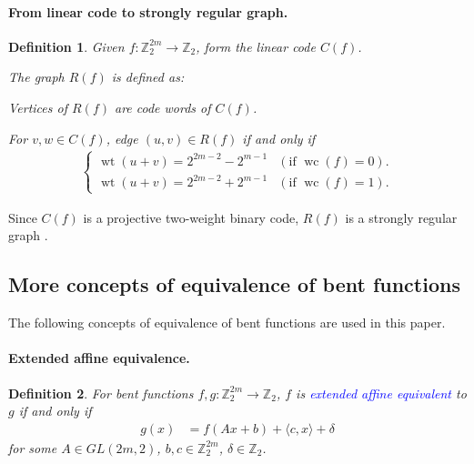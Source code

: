 \documentclass[12pt,a4paper]{article}
\newcommand{\mb}[1]{\mathbb{#1}}
\newcommand{\Z}{\mb{Z}}
\newcommand{\To}{\rightarrow}
\newcommand{\Emph}[1]{\emph{\textcolor{blue}{#1}}}
\newcommand{\weight}[1]{\operatorname{wt}\left(#1\right)}
\newcommand{\weightclass}[1]{\operatorname{wc}\left(#1\right)}
\newtheorem{Definition}{Definition}
\begin{document}
\paragraph*{From linear code to strongly regular graph.}
\begin{Definition}
\label{R-f-def}
Given $f : \Z_2^{2m} \To \Z_2$, form the linear code $C(f)$.

The graph $R(f)$ is defined as:

Vertices of $R(f)$ are code words of $C(f)$.

For $v,w \in C(f)$, edge $(u,v) \in R(f)$ if and only if
\begin{align*}
\begin{cases}
\weight{u+v} = 2^{2m-2} - 2^{m-1} & (\text{if~}\weightclass{f}=0).
\\
\weight{u+v} = 2^{2m-2} + 2^{m-1} & (\text{if~}\weightclass{f}=1).
\end{cases}
\end{align*}

\end{Definition}
Since $C(f)$ is a projective two-weight binary code,
$R(f)$ is a strongly regular graph \cite[Theorem 2]{Del72weights}.


\subsection{More concepts of equivalence of bent functions}
The following concepts of equivalence of bent functions are used in this paper.

\paragraph*{Extended affine equivalence.}

\begin{Definition}
For bent functions $f,g : \Z_2^{2m} \To \Z_2$,
$f$ is \Emph{extended affine equivalent} \cite[Section 1.4]{Tok15bent} to $g$ if and only if
\begin{align*}
g(x) &= f(A x + b) + \langle c, x \rangle + \delta
\end{align*}
for some $A \in GL(2m,2)$, $b, c \in \Z_2^{2m}$, $\delta \in \Z_2$.
\end{Definition}
\end{document}
